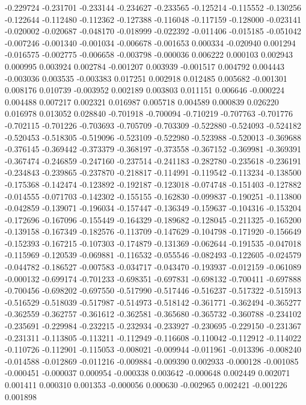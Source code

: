 -0.229724
-0.231701
-0.233144
-0.234627
-0.233565
-0.125214
-0.115552
-0.130256
-0.122644
-0.112480
-0.112362
-0.127388
-0.116048
-0.117159
-0.128000
-0.023141
-0.020002
-0.020687
-0.048170
-0.018999
-0.022392
-0.011406
-0.015185
-0.051042
-0.007246
-0.001340
-0.001034
-0.006678
-0.001653
0.000334
-0.020940
0.001294
-0.016575
-0.002775
-0.006658
-0.003798
-0.000036
0.006222
0.000103
0.002943
0.000995
0.003924
0.002784
-0.001207
0.003939
-0.001517
0.004792
0.004443
-0.003036
0.003535
-0.003383
0.017251
0.002918
0.012485
0.005682
-0.001301
0.008176
0.010739
-0.003952
0.002189
0.003803
0.011151
0.006646
-0.000224
0.004488
0.007217
0.002321
0.016987
0.005718
0.004589
0.000839
0.026220
0.016978
0.013052
0.028840
-0.701918
-0.700094
-0.710219
-0.707763
-0.701776
-0.702115
-0.701226
-0.703693
-0.705709
-0.703309
-0.522880
-0.524093
-0.524182
-0.520453
-0.518305
-0.519096
-0.523109
-0.522980
-0.523988
-0.520013
-0.369688
-0.376145
-0.369442
-0.373379
-0.368197
-0.373558
-0.367152
-0.369981
-0.369391
-0.367474
-0.246859
-0.247160
-0.237514
-0.241183
-0.282780
-0.235618
-0.236191
-0.234843
-0.239865
-0.237870
-0.218817
-0.114991
-0.119542
-0.113234
-0.138500
-0.175368
-0.142474
-0.123892
-0.192187
-0.123018
-0.074748
-0.151403
-0.127882
-0.014555
-0.071703
-0.142302
-0.155155
-0.162830
-0.099837
-0.190251
-0.113800
-0.042859
-0.139071
-0.196034
-0.157447
-0.136349
-0.159637
-0.104316
-0.153204
-0.172696
-0.167096
-0.155449
-0.164329
-0.189682
-0.128045
-0.211325
-0.165200
-0.139158
-0.167349
-0.182576
-0.113709
-0.147629
-0.104798
-0.171920
-0.156649
-0.152393
-0.167215
-0.107303
-0.174879
-0.131369
-0.062644
-0.191535
-0.047018
-0.115969
-0.120539
-0.069881
-0.116532
-0.055546
-0.082493
-0.122605
-0.024579
-0.044782
-0.186527
-0.007583
-0.034717
-0.043470
-0.193937
-0.012159
-0.061089
-0.000132
-0.699174
-0.701233
-0.698351
-0.697831
-0.698132
-0.700411
-0.697888
-0.700456
-0.698202
-0.697550
-0.517990
-0.517446
-0.516237
-0.517322
-0.515913
-0.516529
-0.518039
-0.517987
-0.514973
-0.518142
-0.361771
-0.362494
-0.365277
-0.362559
-0.362757
-0.361612
-0.362581
-0.365680
-0.365732
-0.360788
-0.234102
-0.235691
-0.229984
-0.232215
-0.232934
-0.233927
-0.230695
-0.229150
-0.231367
-0.231311
-0.113805
-0.113211
-0.112949
-0.116608
-0.110042
-0.112912
-0.114022
-0.110726
-0.112901
-0.115053
-0.008021
-0.009944
-0.011961
-0.013396
-0.008240
-0.014588
-0.012869
-0.011216
-0.009884
-0.009390
0.002933
-0.000128
-0.001085
-0.000451
-0.000037
0.000954
-0.000338
0.003642
-0.000648
0.002449
0.002071
0.001411
0.000310
0.001353
-0.000056
0.000630
-0.002965
0.002421
-0.001226
0.001898
